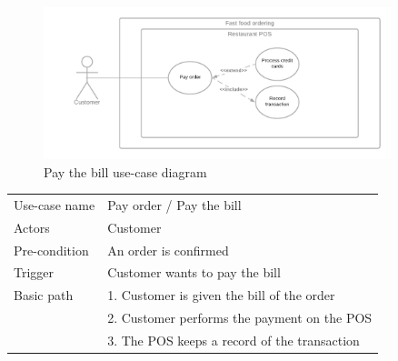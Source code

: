 \documentclass[a4paper]{article}
\numberwithin{equation}{section}
\begin{document}
\begin{figure}[H]
  \centering
  \includegraphics[width=0.9\textwidth]{PayOrder.png}
  \caption{Pay the bill use-case diagram}
\end{figure}

\begin{center}
  \begin{tabular}{*{2}{l}}
    \toprule
    Use-case name  & Pay order / Pay the bill                     \\
    Actors         & Customer                                     \\
    Pre-condition  & An order is confirmed                        \\
    Trigger        & Customer wants to pay the bill               \\
    Basic path     & 1. Customer is given the bill of the order   \\
                   & 2. Customer performs the payment on the POS  \\
                   & 3. The POS keeps a record of the transaction \\
    \bottomrule
  \end{tabular}
\end{center}
\end{document}
